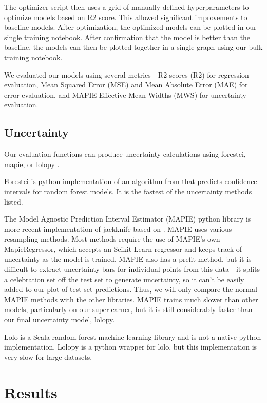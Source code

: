 \documentclass[twocolumn, nofootinbib, secnumarabic, amssymb, nobibnotes, aps, prd]{revtex4-2}
\begin{document}
The optimizer script then uses a grid of manually defined hyperparameters to optimize models based on R2 score. This allowed significant improvements to baseline models. After optimization, the optimized models can be plotted in our single training notebook. After confirmation that the model is better than the baseline, the models can then be plotted together in a single graph using our bulk training notebook. 

We evaluated our models using several metrics - R2 scores (R2) for regression evaluation, Mean Squared Error (MSE) and Mean Absolute Error (MAE) for error evaluation, and MAPIE Effective Mean Widths (MWS) for uncertainty evaluation.

\subsection{Uncertainty}\label{sec:uncertainty}
Our evaluation functions can produce uncertainty calculations using forestci, mapie, or lolopy \cite{Polimis2017, Taquet2022, Hutchinson2022}. 

Forestci is python implementation of an algorithm from \cite{Wager2014} that predicts confidence intervals for random forest models. It is the fastest of the uncertainty methods listed. 

The Model Agnostic Prediction Interval Estimator (MAPIE) python library is more recent implementation of jackknife based on \cite{Foygel2020}. MAPIE uses various resampling methods. Most methods require the use of MAPIE's own MapieRegressor, which accepts an Scikit-Learn regressor and keeps track of uncertainty as the model is trained. MAPIE also has a prefit method, but it is difficult to extract uncertainty bars for individual points from this data - it splits a celebration set off the test set to generate uncertainty, so it can't be easily added to our plot of test set predictions. Thus, we will only compare the normal MAPIE methods with the other libraries. MAPIE trains much slower than other models, particularly on our superlearner, but it is still considerably faster than our final uncertainty model, lolopy.

Lolo is a Scala random forest machine learning library and is not a native python implementation. Lolopy is a python wrapper for lolo, but this implementation is very slow for large datasets. 

\section{Results}
\end{document}
